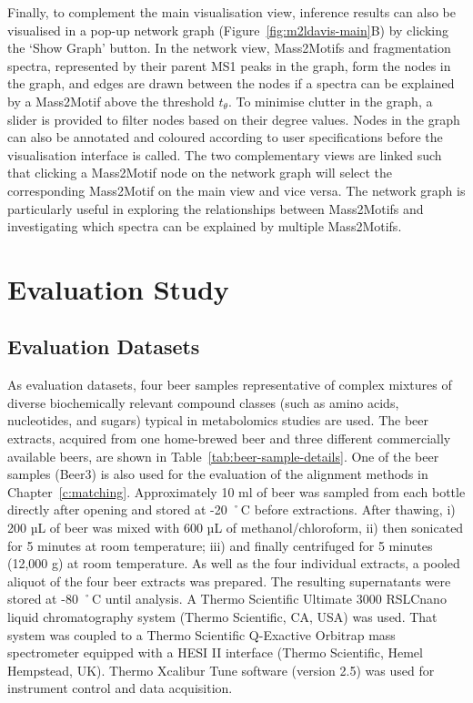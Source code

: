Finally, to complement the main visualisation view, inference results can also be visualised in a pop-up network graph (Figure~\ref{fig:m2ldavis-main}B) by clicking the ‘Show Graph’ button. In the network view, Mass2Motifs and fragmentation spectra, represented by their parent MS1 peaks in the graph, form the nodes in the graph, and edges are drawn between the nodes if a spectra can be explained by a Mass2Motif above the threshold $t_{\theta}$. To minimise clutter in the graph, a slider is provided to filter nodes based on their degree values. Nodes in the graph can also be annotated and coloured according to user specifications before the visualisation interface is called. The two complementary views are linked such that clicking a Mass2Motif node on the network graph will select the corresponding Mass2Motif on the main view and vice versa. The network graph is particularly useful in exploring the relationships between Mass2Motifs and investigating which spectra can be explained by multiple Mass2Motifs.

\section{Evaluation Study}

\subsection{Evaluation Datasets\label{sub:ms2lda-datasets}}

As evaluation datasets, four beer samples representative of complex mixtures of diverse biochemically relevant compound classes (such as amino acids, nucleotides, and sugars) typical in metabolomics studies are used. The beer extracts, acquired from one home-brewed beer and three different commercially available beers, are shown in Table~\ref{tab:beer-sample-details}. One of the beer samples (Beer3) is also used for the evaluation of the alignment methods in Chapter~\ref{c:matching}. Approximately 10 ml of beer was sampled from each bottle directly after opening and stored at -20 ˚C before extractions. After thawing, i) 200 µL of beer was mixed with 600 µL of methanol/chloroform, ii) then sonicated for 5 minutes at room temperature; iii) and finally centrifuged for 5 minutes (12,000 g) at room temperature. As well as the four individual extracts, a pooled aliquot of the four beer extracts was prepared. The resulting supernatants were stored at -80 ˚C until analysis. A Thermo Scientific Ultimate 3000 RSLCnano liquid chromatography system (Thermo Scientific, CA, USA) was used. That system was coupled to a Thermo Scientific Q-Exactive Orbitrap mass spectrometer equipped with a HESI II interface (Thermo Scientific, Hemel Hempstead, UK). Thermo Xcalibur Tune software (version 2.5) was used for instrument control and data acquisition.

